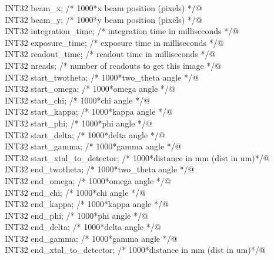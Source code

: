 \documentclass[10pt,a4paper,twoside,notitlepage]{article}
\begin{document}
\begin{flushleft}
\begin{list}{}{}
\mbox{}\verb@         INT32 beam_x;            /* 1000*x beam position (pixels) */@\\
\mbox{}\verb@         INT32 beam_y;            /* 1000*y beam position (pixels) */@\\
\mbox{}\verb@         INT32 integration_time;  /* integration time in  milliseconds */@\\
\mbox{}\verb@         INT32 exposure_time;     /* exposure time in milliseconds */@\\
\mbox{}\verb@         INT32 readout_time;      /* readout time in milliseconds */@\\
\mbox{}\verb@         INT32 nreads;            /* number of readouts to get this  image */@\\
\mbox{}\verb@         INT32 start_twotheta;    /* 1000*two_theta angle */@\\
\mbox{}\verb@         INT32 start_omega;       /* 1000*omega angle */@\\
\mbox{}\verb@         INT32 start_chi;         /* 1000*chi angle */@\\
\mbox{}\verb@         INT32 start_kappa;       /* 1000*kappa angle */@\\
\mbox{}\verb@         INT32 start_phi;         /* 1000*phi angle */@\\
\mbox{}\verb@         INT32 start_delta;       /* 1000*delta angle */@\\
\mbox{}\verb@         INT32 start_gamma;       /* 1000*gamma angle */@\\
\mbox{}\verb@         INT32 start_xtal_to_detector; /* 1000*distance in mm (dist in um)*/@\\
\mbox{}\verb@         INT32 end_twotheta;           /* 1000*two_theta angle */@\\
\mbox{}\verb@         INT32 end_omega;              /* 1000*omega angle */@\\
\mbox{}\verb@         INT32 end_chi;                /* 1000*chi angle */@\\
\mbox{}\verb@         INT32 end_kappa;              /* 1000*kappa angle */@\\
\mbox{}\verb@         INT32 end_phi;                /* 1000*phi angle */@\\
\mbox{}\verb@         INT32 end_delta;              /* 1000*delta angle */@\\
\mbox{}\verb@         INT32 end_gamma;              /* 1000*gamma angle */@\\
\mbox{}\verb@         INT32 end_xtal_to_detector;   /* 1000*distance in mm (dist in um)*/@\\

\end{list}
\end{flushleft}
\end{document}
